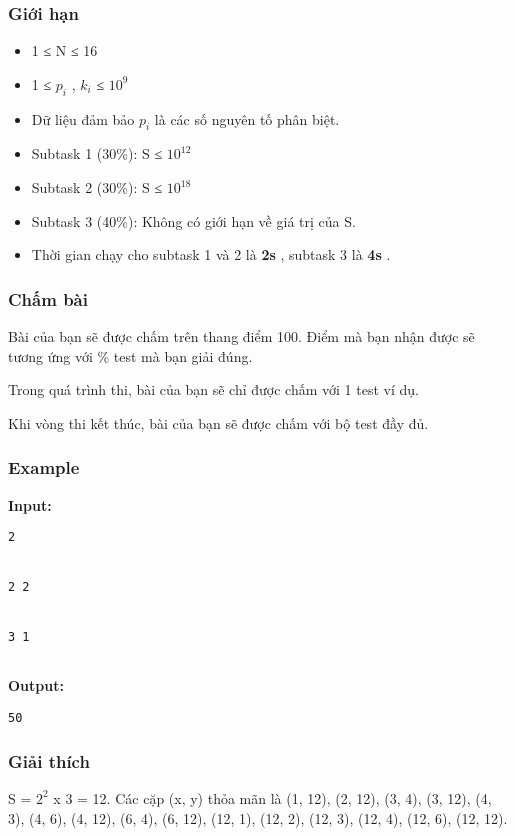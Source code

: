 \subsubsection{   Giới hạn  }
\begin{itemize}
	\item     1 ≤ N ≤ 16   
	\item     1 ≤ $p_{i}$    , $k_{i}$    ≤ $10^{9}$
	\item     Dữ liệu đảm bảo $p_{i}$    là các số nguyên tố phân biệt.   
	\item     Subtask 1 (30\%): S ≤ $10^{12}$
	\item     Subtask 2 (30\%): S ≤ $10^{18}$
	\item     Subtask 3 (40\%): Không có giới hạn về giá trị của S.   
	\item     Thời gian chạy cho subtask 1 và 2 là    \textbf{     2s    }    , subtask 3 là    \textbf{     4s    }    .   
\end{itemize}

\subsubsection{   Chấm bài  }

   Bài của bạn sẽ được chấm trên thang điểm 100. Điểm mà bạn nhận được sẽ tương ứng với \% test mà bạn giải đúng.  

   Trong quá trình thi, bài của bạn sẽ chỉ được chấm với 1 test ví dụ.  

   Khi vòng thi kết thúc, bài của bạn sẽ được chấm với bộ test đầy đủ.  
\begin{itemize}
\end{itemize}
\begin{itemize}
\end{itemize}

\subsubsection{   Example  }

\textbf{    Input:   }
\begin{verbatim}
2


2 2


3 1 


\end{verbatim}

\textbf{    Output:   }
\begin{verbatim}
50
\end{verbatim}

\subsubsection{   Giải thích  }

   S = $2^{2}$   x 3 = 12. Các cặp (x, y) thỏa mãn là (1, 12), (2, 12), (3, 4), (3, 12), (4, 3), (4, 6), (4, 12), (6, 4), (6, 12), (12, 1), (12, 2), (12, 3), (12, 4), (12, 6), (12, 12).  
